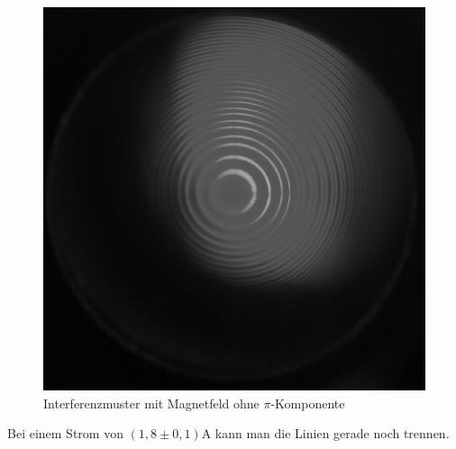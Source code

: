 \begin{figure}
\centering
\includegraphics[scale=0.1]{data/bilder_okular/bild_4_edit.jpg}
\caption{Interferenzmuster mit Magnetfeld ohne $\pi$-Komponente}
\label{fig:bildtransmitBpi}
\end{figure}
Bei einem Strom von $\si{(1,8\pm 0,1)\ampere}$ kann man die Linien gerade noch trennen.

